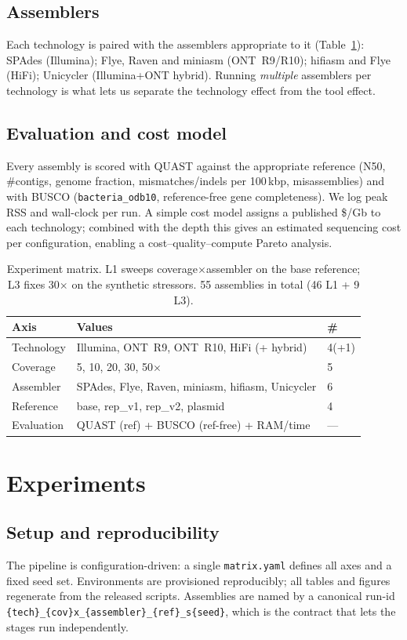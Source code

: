 \documentclass[runningheads]{llncs}
\begin{document}
\subsection{Assemblers}
Each technology is paired with the assemblers appropriate to it
(Table~\ref{tab:matrix}): SPAdes (Illumina); Flye, Raven and miniasm
(ONT~R9/R10); hifiasm and Flye (HiFi); Unicycler (Illumina+ONT hybrid).
Running \emph{multiple} assemblers per technology is what lets us separate the
technology effect from the tool effect.

\subsection{Evaluation and cost model}
Every assembly is scored with QUAST against the appropriate reference
(N50, \#contigs, genome fraction, mismatches/indels per 100\,kbp,
misassemblies) and with BUSCO (\texttt{bacteria\_odb10}, reference-free gene
completeness). We log peak RSS and wall-clock per run. A simple cost model
assigns a published \$/Gb to each technology; combined with the depth this
gives an estimated sequencing cost per configuration, enabling a
cost--quality--compute Pareto analysis.

\begin{table}[t]
\centering
\caption{Experiment matrix. L1 sweeps coverage$\times$assembler on the base
reference; L3 fixes 30$\times$ on the synthetic stressors. 55 assemblies in
total (46 L1 + 9 L3).}
\label{tab:matrix}
\begin{tabular}{lll}
\toprule
Axis & Values & \#\\
\midrule
Technology & Illumina, ONT~R9, ONT~R10, HiFi (+ hybrid) & 4(+1)\\
Coverage   & 5, 10, 20, 30, 50$\times$ & 5\\
Assembler  & SPAdes, Flye, Raven, miniasm, hifiasm, Unicycler & 6\\
Reference  & base, rep\_v1, rep\_v2, plasmid & 4\\
Evaluation & QUAST (ref) + BUSCO (ref-free) + RAM/time & ---\\
\bottomrule
\end{tabular}
\end{table}

\section{Experiments}
\label{sec:exp}

\subsection{Setup and reproducibility}
The pipeline is configuration-driven: a single \texttt{matrix.yaml} defines all
axes and a fixed seed set. Environments are provisioned reproducibly; all
tables and figures regenerate from the released scripts. Assemblies are
named by a canonical run-id \texttt{\{tech\}\_\{cov\}x\_\{assembler\}\_\{ref\}\_s\{seed\}},
which is the contract that lets the stages run independently.
\end{document}
